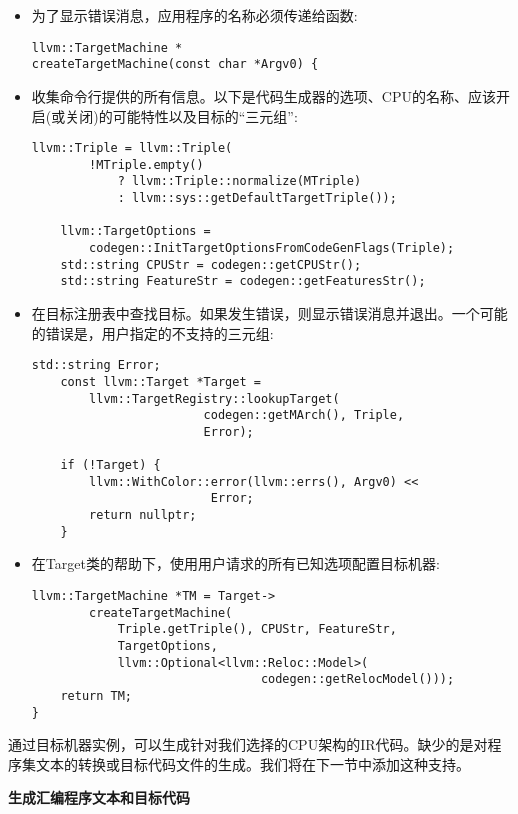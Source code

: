 \begin{itemize}
\item 为了显示错误消息，应用程序的名称必须传递给函数:
\begin{lstlisting}[caption={}]
llvm::TargetMachine *
createTargetMachine(const char *Argv0) {
\end{lstlisting}

\item 收集命令行提供的所有信息。以下是代码生成器的选项、CPU的名称、应该开启(或关闭)的可能特性以及目标的“三元组”:
\begin{lstlisting}[caption={}]
	llvm::Triple = llvm::Triple(
		!MTriple.empty()
			? llvm::Triple::normalize(MTriple)
			: llvm::sys::getDefaultTargetTriple());
			
	llvm::TargetOptions =
		codegen::InitTargetOptionsFromCodeGenFlags(Triple);
	std::string CPUStr = codegen::getCPUStr();
	std::string FeatureStr = codegen::getFeaturesStr();
\end{lstlisting}

\item 在目标注册表中查找目标。如果发生错误，则显示错误消息并退出。一个可能的错误是，用户指定的不支持的三元组:
\begin{lstlisting}[caption={}]
	std::string Error;
	const llvm::Target *Target =
		llvm::TargetRegistry::lookupTarget(
						codegen::getMArch(), Triple,
						Error);
	
	if (!Target) {
		llvm::WithColor::error(llvm::errs(), Argv0) <<
						 Error;
		return nullptr;
	}
\end{lstlisting}

\item 在Target类的帮助下，使用用户请求的所有已知选项配置目标机器:
\begin{lstlisting}[caption={}]
	llvm::TargetMachine *TM = Target->
		createTargetMachine(
			Triple.getTriple(), CPUStr, FeatureStr,
			TargetOptions,
			llvm::Optional<llvm::Reloc::Model>(
								codegen::getRelocModel()));
	return TM;
}
\end{lstlisting}

\end{itemize}

通过目标机器实例，可以生成针对我们选择的CPU架构的IR代码。缺少的是对程序集文本的转换或目标代码文件的生成。我们将在下一节中添加这种支持。\par

\hspace*{\fill} \par %
\textbf{生成汇编程序文本和目标代码}

